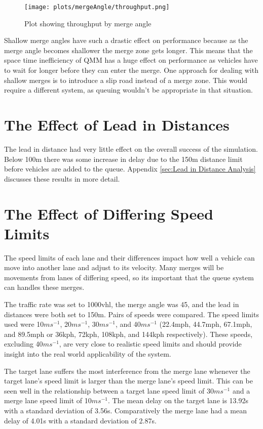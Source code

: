 \begin{figure}[htb]
\centering
\texttt{[image: plots/mergeAngle/throughput.png]}
\caption{Plot showing throughput by merge angle}
\label{fig:throughputMergeAngle}
\end{figure}

Shallow merge angles have such a drastic effect on performance because as the merge angle becomes shallower the merge zone gets longer. This means that the space time inefficiency of QMM has a huge effect on performance as vehicles have to wait for longer before they can enter the merge. One approach for dealing with shallow merges is to introduce a slip road instead of a merge zone. This would require a different system, as queuing wouldn't be appropriate in that situation.

\section{The Effect of Lead in Distances}
\label{sec:The Effect of Lead in Distances}
The lead in distance had very little effect on the overall success of the simulation. Below 100\si{m} there was some increase in delay due to the 150\si{m} distance limit before vehicles are added to the queue. Appendix \ref{sec:Lead in Distance Analysis} discusses these results in more detail.

\section{The Effect of Differing Speed Limits}
\label{sec:The Effect of Differing Speed Limits}
The speed limits of each lane and their differences impact how well a vehicle can move into another lane and adjust to its velocity. Many merges will be movements from lanes of differing speed, so its important that the queue system can handles these merges.

The traffic rate was set to 1000\si{vhl}, the merge angle was 45\degree, and the lead in distances were both set to 150\si{m}. Pairs of speeds were compared. The speed limits used were 10$\si{ms^{-1}}$, 20$\si{ms^{-1}}$, 30$\si{ms^{-1}}$, and 40$\si{ms^{-1}}$ (22.4\si{mph}, 44.7\si{mph}, 67.1\si{mph}, and 89.5\si{mph} or 36\si{kph}, 72\si{kph}, 108\si{kph}, and 144\si{kph} respectively). These speeds, excluding 40$\si{ms^{-1}}$, are very close to realistic speed limits and should provide insight into the real world applicability of the system.

The target lane suffers the most interference from the merge lane whenever the target lane's speed limit is larger than the merge lane's speed limit. This can be seen well in the relationship between a target lane speed limit of 30$\si{ms^{-1}}$ and a merge lane speed limit of 10$\si{ms^{-1}}$. The mean delay on the target lane is 13.92\si{s} with a standard deviation of 3.56\si{s}. Comparatively the merge lane had a mean delay of 4.01\si{s} with a standard deviation of 2.87\si{s}. 

